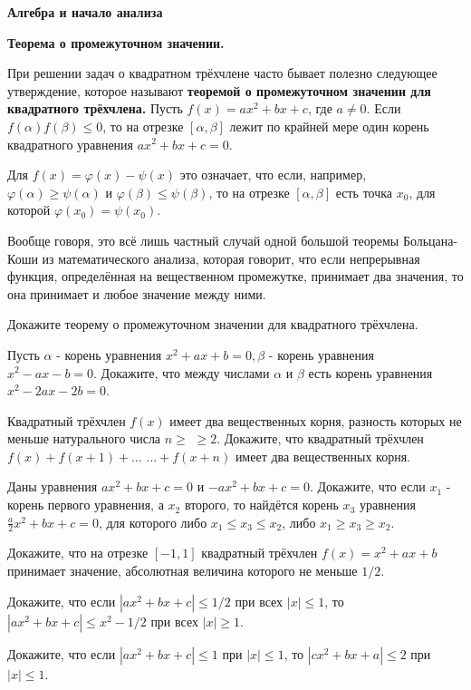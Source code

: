 \centerline{\bf \Huge Алгебра и начало анализа}
\centerline{\bf \Huge Теорема о промежуточном значении.}

\begin{flushright}
        \scriptsize{}
\end{flushright}

При решении задач о квадратном трёхчлене часто бывает полезно следующее утверждение, которое называют \textbf{теоремой о промежуточном значении для квадратного трёхчлена.} Пусть $f(x)=a x^2+b x+c$, где $a \neq 0$. Если $f(\alpha) f(\beta) \leqslant 0$, то на отрезке $[\alpha, \beta]$ лежит по крайней мере один корень квадратного уравнения $a x^2+b x+c=0$.

Для $f(x)=\varphi(x)-\psi(x)$ это означает, что если, например, $\varphi(\alpha) \geqslant \psi(\alpha)$ и $\varphi(\beta) \leqslant \psi(\beta)$, то на отрезке $[\alpha, \beta]$ есть точка $x_0$, для которой $\varphi\left(x_0\right)=\psi\left(x_0\right)$.

Вообще говоря, это всё лишь частный случай одной большой теоремы Больцана-Коши из математического анализа, которая говорит, что если непрерывная функция, определённая на вещественном промежутке, принимает два значения, то она принимает и любое значение между ними.

Докажите теорему о промежуточном значении для квадратного трёхчлена.

Пусть $\alpha$ - корень уравнения $x^2+a x+b=0, \beta$ - корень уравнения $x^2-a x-b=0$. Докажите, что между числами $\alpha$ и $\beta$ есть корень уравнения $x^2-2 a x-2 b=0$.


Квадратный трёхчлен $f(x)$ имеет два вещественных корня, разность которых не меньше натурального числа $n \geqslant$ $\geqslant 2$. Докажите, что квадратный трёхчлен $f(x)+f(x+1)+\ldots$ $\ldots+f(x+n)$ имеет два вещественных корня.

Даны уравнения $a x^2+b x+c=0$ и $-a x^2+b x+c=0$. Докажите, что если $x_1$ - корень первого уравнения, а $x_2$ второго, то найдётся корень $x_3$ уравнения $\frac{a}{2} x^2+b x+c=0$, для которого либо $x_1 \leqslant x_3 \leqslant x_2$, либо $x_1 \geqslant x_3 \geqslant x_2$.

Докажите, что на отрезке $[-1,1]$ квадратный трёхчлен $f(x)=x^2+a x+b$ принимает значение, абсолютная величина которого не меньше $1 / 2$.

Докажите, что если $\left|a x^2+b x+c\right| \leqslant 1 / 2$ при всех $|x| \leqslant 1$, то $\left|a x^2+b x+c\right| \leqslant x^2-1 / 2$ при всех $|x| \geqslant 1$.

Докажите, что если $\left|a x^2+b x+c\right| \leqslant 1$ при $|x| \leqslant 1$, то $\left|c x^2+b x+a\right| \leqslant 2$ при $|x| \leqslant 1$.